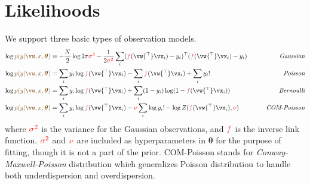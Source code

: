 \documentclass{article}
\newcounter{ct}
\newcommand{\trp}{{^\top}} %
\newcommand{\inverseLink}{\ensuremath{\textcolor{awesome}{f}}}
\newcommand{\weight}{\vw}
\newcommand{\hyp}{\bm{\theta}}
\newcommand{\likelihood}{\ensuremath{\textcolor{goldenbrown}{p(y|\weight,x,\hyp)}}}
\begin{document}
\section{Likelihoods}
We support three basic types of observation models.
\begin{align}
    \log\likelihood &= 
	-\frac{N}{2}\log2\pi\textcolor{red}{\sigma^2}
	- \frac{1}{2\textcolor{red}{\sigma^2}} 
	\sum_i
	    (\inverseLink(\weight\trp\vx_i) - y_i)\trp
	    (\inverseLink(\weight\trp\vx_i) - y_i) 
	\qquad 
	&\text{\it Gaussian}
    \label{eq:likelihood:Gaussian}
    \\
    \log\likelihood &= 
	\sum_i y_i \log \inverseLink(\weight\trp\vx_i)
	-
	\sum_i \inverseLink(\weight\trp\vx_i)
	+ \sum_i y_i!
	\qquad 
	&\text{\it Poisson}
    \label{eq:likelihood:Poisson}
    \\
    \log\likelihood &= 
	\sum_i
	y_i \log\inverseLink(\weight\trp\vx_i)
	+
	\sum_i
	(1-y_i) \log (1-\inverseLink(\weight\trp\vx_i))
	\qquad
	&\text{\it Bernoulli}
    \label{eq:likelihood:Bernoulli}
    \\
    \log\likelihood &= 
	\sum_i
	y_i \log\inverseLink(\weight\trp\vx_i) 
	- \textcolor{red}{\nu} \sum_i \log y_i!
	- \log Z(\inverseLink(\weight\trp\vx_i), \textcolor{red}{\nu})
	&\text{\it COM-Poisson}
    \label{eq:likelihood:COM}
\end{align}
where $\textcolor{red}{\sigma^2}$ is the variance for the Gaussian observations, and $\inverseLink$ is the inverse link function.
$\textcolor{red}{\sigma^2}$ and $\textcolor{red}{\nu}$ are included as hyperparameters in $\hyp$ for the purpose of fitting, though it is not a part of the prior.
COM-Poisson stands for {\it Conway-Maxwell-Poisson} distribution which generalizes Poisson distribution to handle both underdispersion and overdispersion.
\end{document}
